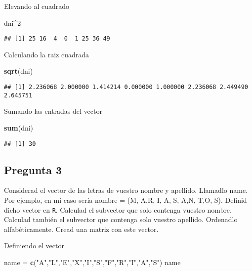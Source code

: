 \documentclass[
]{article}
\newenvironment{Shaded}{\begin{snugshade}}{\end{snugshade}}
\newcommand{\DecValTok}[1]{\textcolor[rgb]{0.00,0.00,0.81}{#1}}
\newcommand{\KeywordTok}[1]{\textcolor[rgb]{0.13,0.29,0.53}{\textbf{#1}}}
\newcommand{\NormalTok}[1]{#1}
\newcommand{\OperatorTok}[1]{\textcolor[rgb]{0.81,0.36,0.00}{\textbf{#1}}}
\newcommand{\StringTok}[1]{\textcolor[rgb]{0.31,0.60,0.02}{#1}}
\begin{document}
Elevando al cuadrado

\begin{Shaded}
\begin{Highlighting}[]
\NormalTok{dni}\OperatorTok{^}\DecValTok{2}
\end{Highlighting}
\end{Shaded}

\begin{verbatim}
## [1] 25 16  4  0  1 25 36 49
\end{verbatim}

Calculando la raiz cuadrada

\begin{Shaded}
\begin{Highlighting}[]
\KeywordTok{sqrt}\NormalTok{(dni)}
\end{Highlighting}
\end{Shaded}

\begin{verbatim}
## [1] 2.236068 2.000000 1.414214 0.000000 1.000000 2.236068 2.449490 2.645751
\end{verbatim}

Sumando las entradas del vector

\begin{Shaded}
\begin{Highlighting}[]
\KeywordTok{sum}\NormalTok{(dni)}
\end{Highlighting}
\end{Shaded}

\begin{verbatim}
## [1] 30
\end{verbatim}

\hypertarget{pregunta-3}{%
\subsection{Pregunta 3}\label{pregunta-3}}

Considerad el vector de las letras de vuestro nombre y apellido.
Llamadlo name. Por ejemplo, en mi caso sería nombre = (M, A,R, I, A, S,
A,N, T,O, S). Definid dicho vector en \texttt{R}. Calculad el subvector
que solo contenga vuestro nombre. Calculad también el subvector que
contenga solo vuestro apellido. Ordenadlo alfabéticamente. Cread una
matriz con este vector.

Definiendo el vector

\begin{Shaded}
\begin{Highlighting}[]
\NormalTok{name =}\StringTok{ }\KeywordTok{c}\NormalTok{(}\StringTok{"A"}\NormalTok{,}\StringTok{"L"}\NormalTok{,}\StringTok{"E"}\NormalTok{,}\StringTok{"X"}\NormalTok{,}\StringTok{"I"}\NormalTok{,}\StringTok{"S"}\NormalTok{,}\StringTok{"F"}\NormalTok{,}\StringTok{"R"}\NormalTok{,}\StringTok{"I"}\NormalTok{,}\StringTok{"A"}\NormalTok{,}\StringTok{"S"}\NormalTok{)}
\NormalTok{name}
\end{Highlighting}
\end{Shaded}
\end{document}

